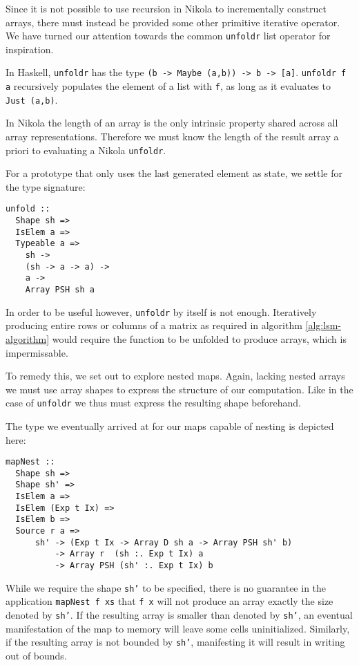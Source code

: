 Since it is not possible to use recursion in Nikola to incrementally construct
arrays, there must instead be provided some other primitive iterative operator.
We have turned our attention towards the common \texttt{unfoldr} list operator
for inspiration.

In Haskell, \texttt{unfoldr} has the type \texttt{(b -> Maybe (a,b)) -> b ->
[a]}.  \texttt{unfoldr f a} recursively populates the element of a list with
\texttt{f}, as long as it evaluates to \texttt{Just (a,b)}.

In Nikola the length of an array is the only intrinsic property shared across
all array representations. Therefore we must know the length of the result array a
priori to evaluating a Nikola \texttt{unfoldr}.

For a prototype that only uses the last generated element as state, we settle
for the type signature:
\begin{verbatim}
unfold ::
  Shape sh =>
  IsElem a =>
  Typeable a =>
    sh ->
    (sh -> a -> a) ->
    a ->
    Array PSH sh a
\end{verbatim}

In order to be useful however, \texttt{unfoldr} by itself is not enough.
Iteratively producing entire rows or columns of a matrix as required in
algorithm \ref{alg:lsm-algorithm} would require the function to be unfolded to produce
arrays, which is impermissable.

To remedy this, we set out to explore nested maps. Again, lacking nested arrays
we must use array shapes to express the structure of our computation.  Like in
the case of \texttt{unfoldr} we thus must express the resulting shape beforehand.

The type we eventually arrived at for our maps capable of nesting is depicted
here:
\begin{verbatim}
mapNest ::
  Shape sh =>
  Shape sh' =>
  IsElem a =>
  IsElem (Exp t Ix) =>
  IsElem b =>
  Source r a =>
      sh' -> (Exp t Ix -> Array D sh a -> Array PSH sh' b)
          -> Array r  (sh :. Exp t Ix) a
          -> Array PSH (sh' :. Exp t Ix) b
\end{verbatim}

While we require the shape \texttt{sh'} to be specified, there is no guarantee
in the application \texttt{mapNest f xs} that \texttt{f x} will not produce an
array exactly the size denoted by \texttt{sh'}. If the resulting array is
smaller than denoted by \texttt{sh'}, an eventual manifestation of the map to
memory will leave some cells uninitialized. Similarly, if the resulting array
is not bounded by \texttt{sh'}, manifesting it will result in writing out of
bounds.

